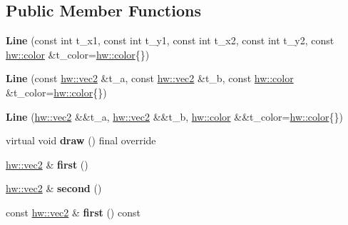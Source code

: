 \subsection*{Public Member Functions}
\begin{DoxyCompactItemize}
\item 
\mbox{\label{classdummy__api_1_1Line_a1f6a830d396867a38be1d6833ee4666b}} 
{\bfseries Line} (const int t\+\_\+x1, const int t\+\_\+y1, const int t\+\_\+x2, const int t\+\_\+y2, const \mbox{\hyperlink{structhw_1_1color}{hw\+::color}} \&t\+\_\+color=\mbox{\hyperlink{structhw_1_1color}{hw\+::color}}\{\})
\item 
\mbox{\label{classdummy__api_1_1Line_a99098816c25c1967145d450e8fa2007d}} 
{\bfseries Line} (const \mbox{\hyperlink{structhw_1_1vec2}{hw\+::vec2}} \&t\+\_\+a, const \mbox{\hyperlink{structhw_1_1vec2}{hw\+::vec2}} \&t\+\_\+b, const \mbox{\hyperlink{structhw_1_1color}{hw\+::color}} \&t\+\_\+color=\mbox{\hyperlink{structhw_1_1color}{hw\+::color}}\{\})
\item 
\mbox{\label{classdummy__api_1_1Line_a46c913c108ad934cc2a462b067fdc408}} 
{\bfseries Line} (\mbox{\hyperlink{structhw_1_1vec2}{hw\+::vec2}} \&\&t\+\_\+a, \mbox{\hyperlink{structhw_1_1vec2}{hw\+::vec2}} \&\&t\+\_\+b, \mbox{\hyperlink{structhw_1_1color}{hw\+::color}} \&\&t\+\_\+color=\mbox{\hyperlink{structhw_1_1color}{hw\+::color}}\{\})
\item 
\mbox{\label{classdummy__api_1_1Line_a399c44964cd1e5868a1387f749f48863}} 
virtual void {\bfseries draw} () final override
\item 
\mbox{\label{classdummy__api_1_1Line_a7490e7861a658e1a4dcae8549016cbe5}} 
\mbox{\hyperlink{structhw_1_1vec2}{hw\+::vec2}} \& {\bfseries first} ()
\item 
\mbox{\label{classdummy__api_1_1Line_abda4b1a3e0302622728aafd5dca8d6a7}} 
\mbox{\hyperlink{structhw_1_1vec2}{hw\+::vec2}} \& {\bfseries second} ()
\item 
\mbox{\label{classdummy__api_1_1Line_a073d0eaa2030b57357ca7104cb8f1673}} 
const \mbox{\hyperlink{structhw_1_1vec2}{hw\+::vec2}} \& {\bfseries first} () const

\end{DoxyCompactItemize}
